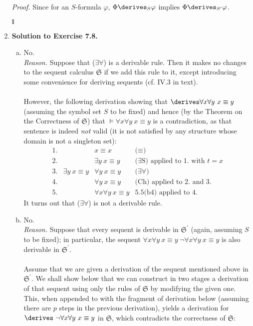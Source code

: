 \begin{enumerate}[1.]
\textit{Proof.} Since for an $S$-formula $\varphi$, $\Phi \derives_S \varphi$ implies $\Phi \derives_{S^\prime} \varphi$. \begin{flushright}$\talloblong$\end{flushright}
%
\item \textbf{Solution to Exercise 7.8.}
\begin{enumerate}[(a)]
\item No.\\
\textit{Reason.} Suppose that ($\exists\forall$) is a derivable rule. Then it makes no changes to the sequent calculus $\mathfrak{S}$ if we add this rule to it, except introducing some convenience for deriving sequents (cf. IV.3 in text).\\
\\
However, the following derivation showing that $\derives \forall x \forall y \ x \equiv y$ (assuming the symbol set $S$ to be fixed) and hence (by the Theorem on the Correctness of $\mathfrak{S}$) that $\models \forall x \forall y \ x \equiv y$ is a contradiction, as that sentence is indeed \emph{not} valid (it is not satisfied by any structure whose domain is not a singleton set):\\
\[
\begin{array}{llll}
1. & \ & x \equiv x & \mbox{($\equiv$)}\\
2. & \ & \exists y \ x \equiv y & \mbox{($\exists$S) applied to 1. with $t = x$}\\
3. & \exists y \ x \equiv y & \forall y \ x \equiv y & \mbox{($\exists\forall$)}\\
4. & \ & \forall y \ x \equiv y & \mbox{(Ch) applied to 2. and 3.}\\
5. & \ & \forall x \forall y \ x \equiv y & \mbox{5.5(b4) applied to 4.}
\end{array}
\]
It turns out that ($\exists\forall$) is not a derivable rule.
\item No.\\
\textit{Reason.} Suppose that every sequent is derivable in $\mathfrak{S}^\prime$ (again, assuming $S$ to be fixed); in particular, the sequent $\forall x \forall y \  x \equiv y \ \neg \forall x \forall y \ x \equiv y$ is also derivable in $\mathfrak{S}^\prime$.\\
\\
Assume that we are given a derivation of the sequent mentioned above in $\mathfrak{S}^\prime$. We shall show below that we can construct in two stages a derivation of that sequent using only the rules of $\mathfrak{S}$ by modifying the given one. This, when appended to with the fragment of derivation below (assuming there are $p$ steps in the previous derivation), yields a derivation for $\derives \ \neg\forall x \forall y \ x \equiv y$ in $\mathfrak{S}$, which contradicts the correctness of $\mathfrak{S}$:

\end{enumerate}
\end{enumerate}
